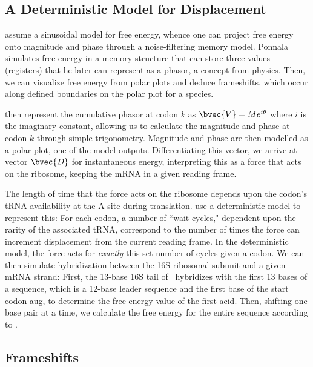 \documentclass[12pt, draft]{article}
\numberwithin{equation}{section}
\begin{document}
\subsection{A Deterministic Model for Displacement} 
 
\citet{lalit:mechanics} assume a sinusoidal model for
free energy, whence one can project free energy onto magnitude and
phase through a noise-filtering memory model. Ponnala simulates free
energy in a memory structure that can store three values (registers)
that he later can represent as a phasor, a concept from physics. Then,
we can visualize free energy from polar plots and deduce frameshifts,
which occur along defined boundaries on the polar plot for a species.
 
\citet{lalit:embs} then represent the cumulative phasor
at codon $k$ as $\bvec{V} = Me^{i\theta}$ where $i$ is the imaginary
constant, allowing us to calculate the magnitude and phase at codon
$k$ through simple trigonometry. Magnitude and phase are then modelled
as a polar plot, one of the model outputs. Differentiating this vector, we
arrive at vector $\bvec{D}$ for instantaneous energy, interpreting
this as a force that acts on the ribosome, keeping the mRNA in
a given reading frame.
 
The length of time that the force acts on the ribosome depends upon
the codon's tRNA availability at the A-site during translation.
\citeauthor{lalit:mechanics} use a deterministic model to represent this: For each codon,
a number of ``wait cycles," dependent upon the rarity of the
associated tRNA, correspond to the number of times the force can
increment displacement from the current reading frame.  In the
deterministic model, the force acts for \emph{exactly} this set number
of cycles given a codon. We can then simulate hybridization between the
16S ribosomal subunit and a given mRNA strand: First, the 13-base 16S
tail of \ecoli\ hybridizes with the first 13 bases of a sequence,
which is a 12-base leader sequence and the first base of the start
codon aug, to determine the free energy value of the first acid.
Then, shifting one base pair at a time, we calculate the free energy
for the entire sequence according to \citet{starmer}.

\subsection{Frameshifts}
\label{section:frameshifts}
\end{document}
